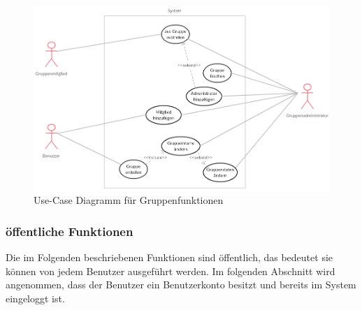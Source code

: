 \documentclass[parskip=full]{scrartcl}
\begin{document}
\begin{figure}[H]
	\centering
	\includegraphics[width=1\textwidth]{Use_Cases/use_case_Gruppen.png}
	\caption{Use-Case Diagramm für Gruppenfunktionen}
\end{figure}



\subsubsection{öffentliche Funktionen}
Die im Folgenden beschriebenen Funktionen sind öffentlich, das bedeutet sie können von jedem Benutzer ausgeführt werden.
Im folgenden Abschnitt wird angenommen, dass der Benutzer ein Benutzerkonto besitzt und bereits im System eingeloggt ist.
\end{document}
